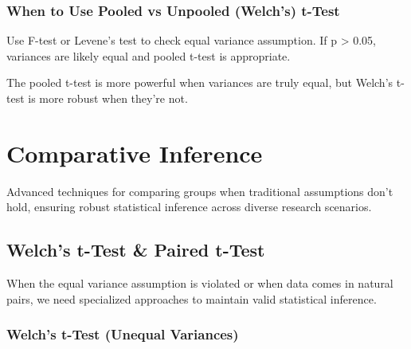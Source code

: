 \documentclass[
  11pt,
  letterpaper,
  oneside]{book}
\begin{document}
\subsection{When to Use Pooled vs Unpooled (Welch's)
t-Test}\label{when-to-use-pooled-vs-unpooled-welchs-t-test}

\begin{tcolorbox}[enhanced jigsaw, toprule=.15mm, left=2mm, opacitybacktitle=0.6, colframe=quarto-callout-warning-color-frame, leftrule=.75mm, titlerule=0mm, coltitle=black, colbacktitle=quarto-callout-warning-color!10!white, toptitle=1mm, title=\textcolor{quarto-callout-warning-color}{\faExclamationTriangle}\hspace{0.5em}{Testing Equal Variances}, bottomtitle=1mm, arc=.35mm, rightrule=.15mm, bottomrule=.15mm, breakable, opacityback=0, colback=white]

Use F-test or Levene's test to check equal variance assumption. If p
\textgreater{} 0.05, variances are likely equal and pooled t-test is
appropriate.

\end{tcolorbox}

The pooled t-test is more powerful when variances are truly equal, but
Welch's t-test is more robust when they're not.


\chapter{Comparative Inference}\label{comparative-inference}

Advanced techniques for comparing groups when traditional assumptions
don't hold, ensuring robust statistical inference across diverse
research scenarios.

\section{Welch's t-Test \& Paired
t-Test}\label{welchs-t-test-paired-t-test}

When the equal variance assumption is violated or when data comes in
natural pairs, we need specialized approaches to maintain valid
statistical inference.

\subsection{Welch's t-Test (Unequal
Variances)}\label{welchs-t-test-unequal-variances}
\end{document}
